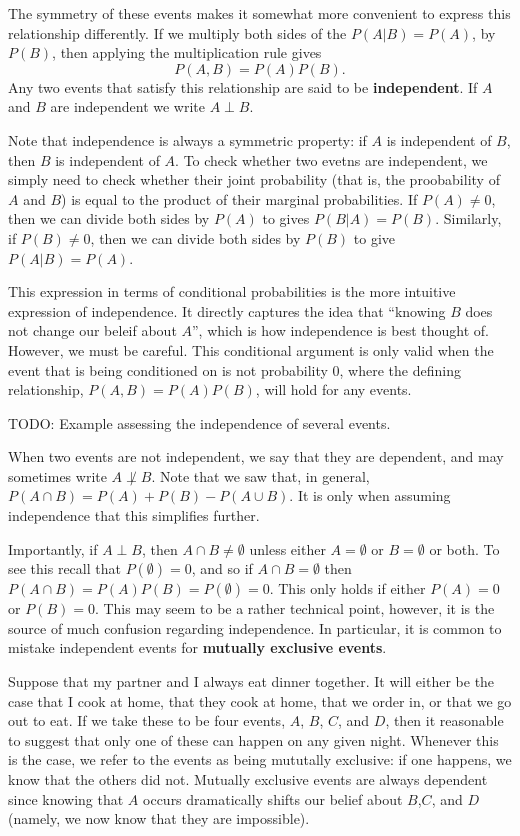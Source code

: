 \documentclass[
  letterpaper,
  DIV=11,
  numbers=noendperiod]{scrreprt}
\begin{document}
The symmetry of these events makes it somewhat more convenient to
express this relationship differently. If we multiply both sides of the
\(P(A|B)=P(A)\), by \(P(B)\), then applying the multiplication rule
gives \[P(A,B) = P(A)P(B).\] Any two events that satisfy this
relationship are said to be \textbf{independent}. If \(A\) and \(B\) are
independent we write \(A\perp B\).

Note that independence is always a symmetric property: if \(A\) is
independent of \(B\), then \(B\) is independent of \(A\). To check
whether two evetns are independent, we simply need to check whether
their joint probability (that is, the proobability of \(A\) and \(B\))
is equal to the product of their marginal probabilities. If
\(P(A)\neq 0\), then we can divide both sides by \(P(A)\) to gives
\(P(B|A) = P(B)\). Similarly, if \(P(B)\neq 0\), then we can divide both
sides by \(P(B)\) to give \(P(A|B)=P(A)\).

This expression in terms of conditional probabilities is the more
intuitive expression of independence. It directly captures the idea that
``knowing \(B\) does not change our beleif about \(A\)'', which is how
independence is best thought of. However, we must be careful. This
conditional argument is only valid when the event that is being
conditioned on is not probability \(0\), where the defining
relationship, \(P(A,B) = P(A)P(B)\), will hold for any events.

TODO: Example assessing the independence of several events.

When two events are not independent, we say that they are dependent, and
may sometimes write \(A\not\perp B\). Note that we saw that, in general,
\(P(A\cap B) =  P(A)+P(B)-P(A\cup B)\). It is only when assuming
independence that this simplifies further.

Importantly, if \(A\perp B\), then \(A\cap B\neq \emptyset\) unless
either \(A=\emptyset\) or \(B=\emptyset\) or both. To see this recall
that \(P(\emptyset) = 0\), and so if \(A\cap B = \emptyset\) then
\(P(A\cap B) = P(A)P(B) = P(\emptyset) = 0\). This only holds if either
\(P(A) = 0\) or \(P(B) = 0\). This may seem to be a rather technical
point, however, it is the source of much confusion regarding
independence. In particular, it is common to mistake independent events
for \textbf{mutually exclusive events}.

Suppose that my partner and I always eat dinner together. It will either
be the case that I cook at home, that they cook at home, that we order
in, or that we go out to eat. If we take these to be four events, \(A\),
\(B\), \(C\), and \(D\), then it reasonable to suggest that only one of
these can happen on any given night. Whenever this is the case, we refer
to the events as being mututally exclusive: if one happens, we know that
the others did not. Mutually exclusive events are always dependent since
knowing that \(A\) occurs dramatically shifts our belief about
\(B\),\(C\), and \(D\) (namely, we now know that they are impossible).
\end{document}
